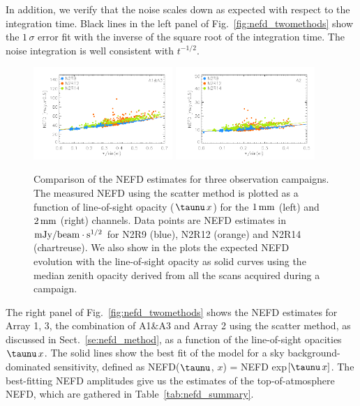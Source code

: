 In addition, we verify that the noise scales down as expected with
respect to the integration time. Black lines in the left panel of
Fig.~\ref{fig:nefd_twomethods} show the $1\, \sigma$ error fit with the
inverse of the square root of the integration time. The noise
integration is well consistent with $t^{-1/2}$.

\begin{figure}[!thbp]
\begin{center}
\includegraphics[clip=true,width=0.47\textwidth]{Figures/plot_nefd_vs_obstau_corrected_skydip_vfinal_1mm.pdf}
\includegraphics[clip=true,width=0.47\textwidth]{Figures/plot_nefd_vs_obstau_corrected_skydip_vfinal_a2.pdf}
\caption{Comparison of the NEFD estimates for three observation
  campaigns. The measured NEFD using the scatter method is plotted as a function of
  line-of-sight opacity ($\taunu\,x$) for the $1\,\rm{mm}$ (left) and $2\,\rm{mm}$ (right)
  channels. Data points are NEFD estimates in $\rm{mJy}/{beam}\cdot s^{1/2}$ for N2R9 (blue), N2R12 (orange)
  and N2R14 (chartreuse). We also show in the plots the expected NEFD evolution
  with the line-of-sight opacity as solid curves using the median
  zenith opacity derived from all the scans acquired during a campaign.}
\label{fig:nefdvsbackground_below_1Jy}
\end{center}
\end{figure}

The right panel of Fig.~\ref{fig:nefd_twomethods} shows the NEFD
estimates for  Array 1, 3, the combination of A1$\&$A3 and Array 2
using the scatter method, as discussed in Sect.~\ref{se:nefd_method},
as a function of the line-of-sight opacities $\taunu\,x $.
The solid lines show the best fit of the model for a sky
background-dominated sensitivity,
defined as NEFD($\taunu$, $x$) = NEFD exp${[\taunu\, x]}$. The
best-fitting NEFD amplitudes give us the estimates of the
top-of-atmosphere NEFD, which are gathered in
Table~\ref{tab:nefd_summary}.

